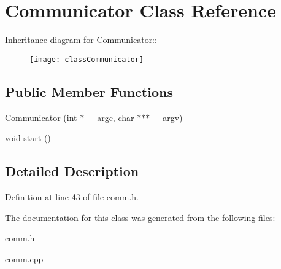 \hypertarget{classCommunicator}{
\section{Communicator Class Reference}
\label{classCommunicator}
}
Inheritance diagram for Communicator::\begin{figure}[H]
\begin{center}
\leavevmode
\texttt{[image: classCommunicator]}
\end{center}
\end{figure}
\subsection*{Public Member Functions}
\begin{CompactItemize}
\item 
\hypertarget{classCommunicator_7c9dce4ea92bd04d01d53f80c0ef08ee}{
\hyperlink{classCommunicator_7c9dce4ea92bd04d01d53f80c0ef08ee}{Communicator} (int $\ast$\_\-\_\-argc, char $\ast$$\ast$$\ast$\_\-\_\-argv)}
\label{classCommunicator_7c9dce4ea92bd04d01d53f80c0ef08ee}

\item 
\hypertarget{classCommunicator_142fae13b16b166519315f248a513c62}{
void \hyperlink{classCommunicator_142fae13b16b166519315f248a513c62}{start} ()}
\label{classCommunicator_142fae13b16b166519315f248a513c62}

\end{CompactItemize}


\subsection{Detailed Description}




Definition at line 43 of file comm.h.

The documentation for this class was generated from the following files:\begin{CompactItemize}
\item 
comm.h\item 
comm.cpp\end{CompactItemize}
